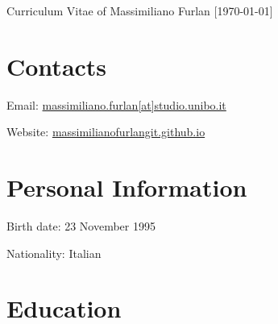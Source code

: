 \documentclass[11pt,a4paper]{article}
\begin{document}
\date{}
\thispagestyle{empty}
\setlength\cvlabelwidth{90pt}

\begin{cv}{\huge Curriculum Vitae of Massimiliano Furlan \large{[\today ]}}

\section{Contacts}

\begin{cvlist}{}
	\itemsep -4pt
	\item[Email:] \href{mailto:massimiliano.furlan[at]studio.unibo.it}{massimiliano.furlan[at]studio.unibo.it}
	\item[Website:] \href{https://massimilianofurlangit.github.io}{massimilianofurlangit.github.io}
\end{cvlist}
\vspace{-20pt}

\section{Personal Information}

\begin{cvlist}{}
	\itemsep -4pt
	\item[Birth date:] 23 November 1995
	\item[Nationality:] Italian
\end{cvlist}
\vspace{-20pt}

\section{Education}


\end{cv}
\end{document}
